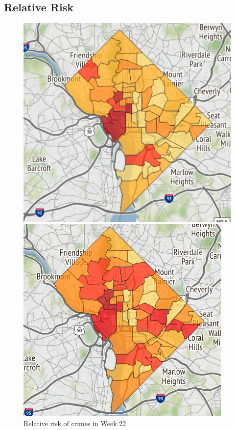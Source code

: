 \documentclass[letterpaper]{article}
\begin{document}
	\subsection{Relative Risk}
	\begin{figure}[!ht]
		\includegraphics[width=\linewidth]{./w22_relative.png}
		\caption{Relative risk of crimes in Week 22}
		\label{p3}
		\endminipage\hfill
		\includegraphics[width=\linewidth]{./w23_relative.png}

\end{figure}
\end{document}
